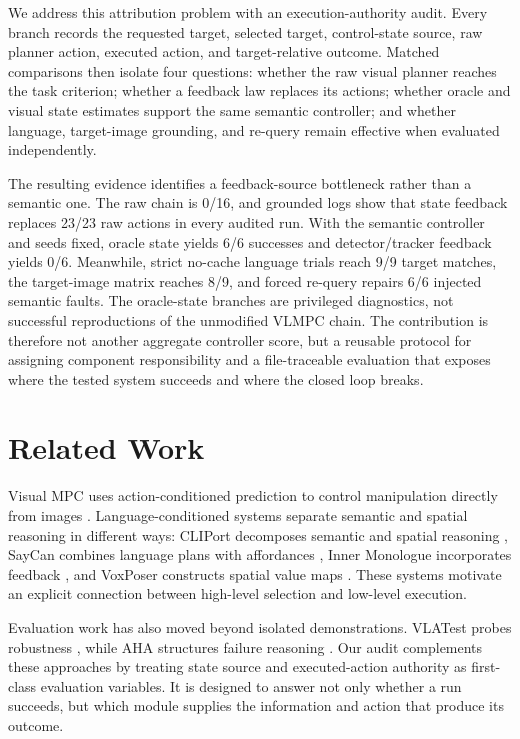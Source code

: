\documentclass[conference]{IEEEtran}
\begin{document}
We address this attribution problem with an execution-authority audit. Every branch records the requested target, selected target, control-state source, raw planner action, executed action, and target-relative outcome. Matched comparisons then isolate four questions: whether the raw visual planner reaches the task criterion; whether a feedback law replaces its actions; whether oracle and visual state estimates support the same semantic controller; and whether language, target-image grounding, and re-query remain effective when evaluated independently.

The resulting evidence identifies a feedback-source bottleneck rather than a semantic one. The raw chain is 0/16, and grounded logs show that state feedback replaces 23/23 raw actions in every audited run. With the semantic controller and seeds fixed, oracle state yields 6/6 successes and detector/tracker feedback yields 0/6. Meanwhile, strict no-cache language trials reach 9/9 target matches, the target-image matrix reaches 8/9, and forced re-query repairs 6/6 injected semantic faults. The oracle-state branches are privileged diagnostics, not successful reproductions of the unmodified VLMPC chain. The contribution is therefore not another aggregate controller score, but a reusable protocol for assigning component responsibility and a file-traceable evaluation that exposes where the tested system succeeds and where the closed loop breaks.

\section{Related Work}
Visual MPC uses action-conditioned prediction to control manipulation directly from images \cite{finn2017deep,ebert2018visual}. Language-conditioned systems separate semantic and spatial reasoning in different ways: CLIPort decomposes semantic and spatial reasoning \cite{shridhar2021cliport}, SayCan combines language plans with affordances \cite{ahn2022saycan}, Inner Monologue incorporates feedback \cite{huang2022inner}, and VoxPoser constructs spatial value maps \cite{huang2023voxposer}. These systems motivate an explicit connection between high-level selection and low-level execution.

Evaluation work has also moved beyond isolated demonstrations. VLATest probes robustness \cite{wang2024vlatest}, while AHA structures failure reasoning \cite{duan2024aha}. Our audit complements these approaches by treating state source and executed-action authority as first-class evaluation variables. It is designed to answer not only whether a run succeeds, but which module supplies the information and action that produce its outcome.
\end{document}
